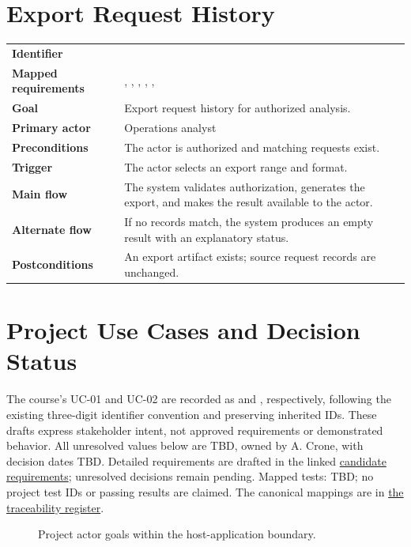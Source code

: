 \section{Export Request History}
\begin{tabularx}{\linewidth}{L{3.5cm}Y}
\toprule
\textbf{Identifier} & \\
\textbf{Mapped requirements} & , , , , , \\
\textbf{Goal} & Export request history for authorized analysis.\\
\textbf{Primary actor} & Operations analyst\\
\textbf{Preconditions} & The actor is authorized and matching requests exist.\\
\textbf{Trigger} & The actor selects an export range and format.\\
\textbf{Main flow} & The system validates authorization, generates the export, and makes the result available to the actor.\\
\textbf{Alternate flow} & If no records match, the system produces an empty result with an explanatory status.\\
\textbf{Postconditions} & An export artifact exists; source request records are unchanged.\\
\bottomrule
\end{tabularx}

\section{Project Use Cases and Decision Status}
\label{Section:SP800ProjectUseCases}
The course's UC-01 and UC-02 are recorded as  and
, respectively, following the existing three-digit
identifier convention and preserving inherited IDs. These drafts express
stakeholder intent, not approved requirements or demonstrated behavior.
All unresolved values below are TBD, owned by A. Crone, with decision dates
TBD. Detailed requirements are drafted in the linked
\hyperref[Table:PendingStoryRequirements]{candidate requirements}; unresolved decisions remain pending.
Mapped tests: TBD; no project test IDs or passing results are claimed.
The canonical mappings are in \hyperref[Table:TraceabilityMatrix]{the traceability register}.

\begin{figure}[htbp]
\centering

\caption{Project actor goals within the host-application boundary.}
\label{Figure:SP800ProjectUseCases}
\end{figure}

